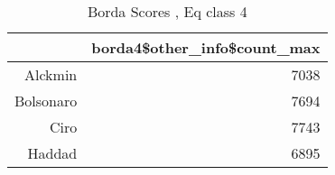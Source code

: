 \begin{table}[ht]
\centering
\begin{tabular}{rr}
  \hline
 & borda4\$other\_info\$count\_max \\ 
  \hline
Alckmin & 7038 \\ 
  Bolsonaro & 7694 \\ 
  Ciro & 7743 \\ 
  Haddad & 6895 \\ 
   \hline
\end{tabular}
\caption{Borda Scores , Eq class 4} 
\label{tbl:subtab2_eq4}
\end{table}
